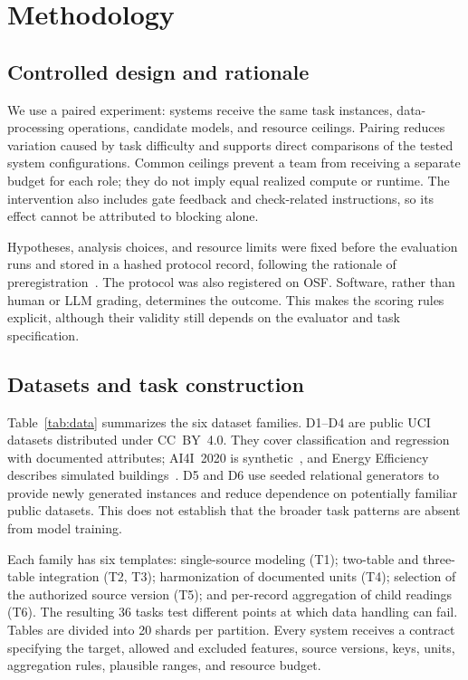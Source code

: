 \documentclass[conference]{IEEEtran}
\begin{document}
\section{Methodology}
\label{sec:method}
\subsection{Controlled design and rationale}
We use a paired experiment: systems receive the same task instances, data-processing operations, candidate models, and resource ceilings. Pairing reduces variation caused by task difficulty and supports direct comparisons of the tested system configurations. Common ceilings prevent a team from receiving a separate budget for each role; they do not imply equal realized compute or runtime. The intervention also includes gate feedback and check-related instructions, so its effect cannot be attributed to blocking alone.

Hypotheses, analysis choices, and resource limits were fixed before the evaluation runs and stored in a hashed protocol record, following the rationale of preregistration~\cite{nosek2018prereg}. The protocol was also registered on OSF. Software, rather than human or LLM grading, determines the outcome. This makes the scoring rules explicit, although their validity still depends on the evaluator and task specification.

\subsection{Datasets and task construction}
\label{sec:bench}
Table~\ref{tab:data} summarizes the six dataset families. D1--D4 are public UCI datasets distributed under CC~BY~4.0. They cover classification and regression with documented attributes; AI4I~2020 is synthetic~\cite{matzka2020ai4i}, and Energy Efficiency describes simulated buildings~\cite{tsanas2012energy}. D5 and D6 use seeded relational generators to provide newly generated instances and reduce dependence on potentially familiar public datasets. This does not establish that the broader task patterns are absent from model training.

Each family has six templates: single-source modeling (T1); two-table and three-table integration (T2, T3); harmonization of documented units (T4); selection of the authorized source version (T5); and per-record aggregation of child readings (T6). The resulting 36 tasks test different points at which data handling can fail. Tables are divided into 20 shards per partition. Every system receives a contract specifying the target, allowed and excluded features, source versions, keys, units, aggregation rules, plausible ranges, and resource budget.
\end{document}
